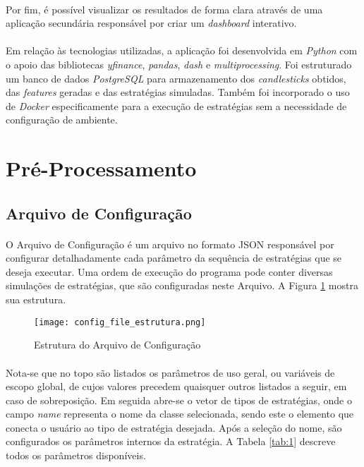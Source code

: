 \paragraph{} Por fim, é possível visualizar os resultados de forma clara através de uma aplicação secundária responsável por criar um \textit{dashboard} interativo.

\paragraph{} Em relação às tecnologias utilizadas, a aplicação foi desenvolvida em \textit{Python} com o apoio das bibliotecas \textit{yfinance}, \textit{pandas}, \textit{dash} e \textit{multiprocessing}. Foi estruturado um banco de dados \textit{PostgreSQL} para armazenamento dos \textit{candlesticks} obtidos, das \textit{features} geradas e das estratégias simuladas. Também foi incorporado o uso de \textit{Docker} especificamente para a execução de estratégias sem a necessidade de configuração de ambiente.

\section{Pré-Processamento}

\subsection{Arquivo de Configuração}

\paragraph{} O Arquivo de Configuração é um arquivo no formato JSON responsável por configurar detalhadamente cada parâmetro da sequência de estratégias que se deseja executar. Uma ordem de execução do programa pode conter diversas simulações de estratégias, que são configuradas neste Arquivo. A Figura \ref{fig:101} mostra sua estrutura.

\begin{figure}[h]
    \texttt{[image: config\_file\_estrutura.png]}
    \centering
    \caption{Estrutura do Arquivo de Configuração}
    \label{fig:101}
\end{figure}

\paragraph{} Nota-se que no topo são listados os parâmetros de uso geral, ou variáveis de escopo global, de cujos valores precedem quaisquer outros listados a seguir, em caso de sobreposição. Em seguida abre-se o vetor de tipos de estratégias, onde o campo \textit{name} representa o nome da classe selecionada, sendo este o elemento que conecta o usuário ao tipo de estratégia desejada. Após a seleção do nome, são configurados os parâmetros internos da estratégia. A Tabela \ref{tab:1} descreve todos os parâmetros disponíveis.

